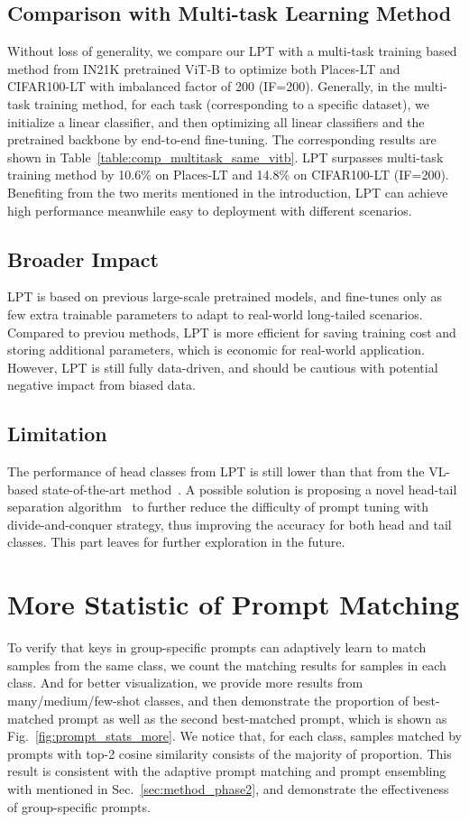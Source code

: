 \documentclass{article} \usepackage{iclr2023_conference,times}
\begin{document}
\subsection{Comparison with Multi-task Learning Method}\label{sec:ablation_multitask}
Without loss of generality, we compare our LPT with a multi-task training based method from IN21K pretrained ViT-B to optimize both Places-LT and CIFAR100-LT with imbalanced factor of 200 (IF=200). Generally, in the multi-task training method, for each task (corresponding to a specific dataset), we initialize a linear classifier, and then optimizing all linear classifiers and the pretrained backbone by end-to-end fine-tuning. The corresponding results are shown in Table~\ref{table:comp_multitask_same_vitb}. LPT surpasses multi-task training method by 10.6\% on Places-LT and 14.8\% on CIFAR100-LT (IF=200). Benefiting from the two merits mentioned in the introduction, LPT can achieve high performance meanwhile easy to deployment with different scenarios.

\subsection{Broader Impact}
LPT is based on previous large-scale pretrained models, and fine-tunes only as few extra trainable parameters to adapt to real-world long-tailed scenarios. 
Compared to previou methods, LPT is more efficient for saving training cost and storing additional parameters, which is economic for real-world application.
However, LPT is still fully data-driven, and should be cautious with potential negative impact
from biased data.

\subsection{Limitation}
The performance of head classes from LPT is still lower than that from the VL-based state-of-the-art method~\citep{tian2021vl}. A possible solution is proposing a novel head-tail separation algorithm~\citep{xu2022constructing} to further reduce the difficulty of prompt tuning with divide-and-conquer strategy, thus improving the accuracy for both head and tail classes.
This part leaves for further exploration in the future. 

\section{More Statistic of Prompt Matching}
To verify that keys in group-specific prompts can adaptively learn to match samples from the same class, we count the matching results for samples in each class. And for better visualization, we provide more results from many/medium/few-shot classes, and then demonstrate the proportion of best-matched prompt as well as the second best-matched prompt, which is shown as Fig.~\ref{fig:prompt_stats_more}.
We notice that, for each class, samples matched by prompts with top-2 cosine similarity consists of the majority of proportion. This result is consistent with the adaptive prompt matching and prompt ensembling with  mentioned in Sec.~\ref{sec:method_phase2}, and demonstrate the effectiveness of group-specific prompts. 
\end{document}
